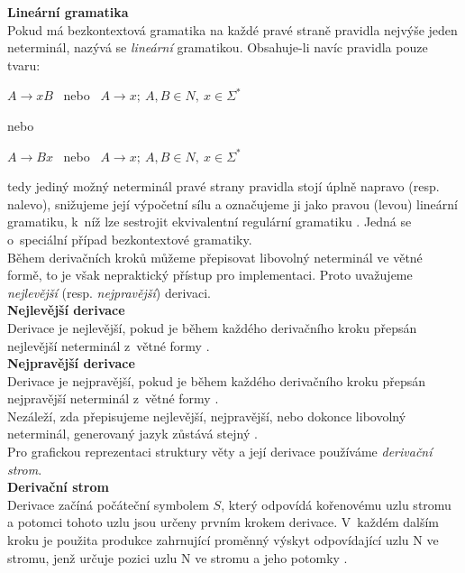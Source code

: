 \textbf{Lineární gramatika} \\
Pokud má bezkontextová gramatika na každé pravé straně pravidla nejvýše jeden neterminál, nazývá se \textit{lineární} gramatikou. Obsahuje-li navíc 
pravidla pouze tvaru:
\begin{center}
$ A \rightarrow xB$ \ nebo \ $A \rightarrow x; \ A,B \in N, \ x \in \Sigma^*$
\end{center}
nebo
\begin{center}
$ A \rightarrow Bx$ \ nebo \ $A \rightarrow x; \ A,B \in N, \ x \in \Sigma^*$
\end{center}
tedy jediný možný neterminál pravé strany pravidla stojí úplně napravo (resp. nalevo), snižujeme její výpočetní sílu a označujeme ji jako pravou 
(levou) lineární gramatiku, k~níž lze sestrojit ekvivalentní regulární gramatiku \cite[str. 17]{TIN2013}. Jedná se o~speciální případ bezkontextové 
gramatiky. \\

Během derivačních kroků můžeme přepisovat libovolný neterminál ve větné formě, to je však nepraktický přístup pro implementaci. Proto uvažujeme 
\textit{nejlevější} (resp. \textit{nejpravější}) derivaci. \\

\textbf{Nejlevější derivace} \\
Derivace je nejlevější, pokud je během každého derivačního kroku přepsán nejlevější neterminál z~větné formy 
\cite[str. 90]{Meduna2014}.\\

\textbf{Nejpravější derivace} \\
Derivace je nejpravější, pokud je během každého derivačního kroku přepsán nejpravější neterminál z~větné formy 
\cite[str. 92]{Meduna2014}. \\

Nezáleží, zda přepisujeme nejlevější, nejpravější, nebo dokonce libovolný neterminál, generovaný jazyk zůstává stejný 
\cite[str. 94]{Meduna2014}. \\

Pro grafickou reprezentaci struktury věty a její derivace používáme \textit{derivační strom}. \\

\textbf{Derivační strom} \\
Derivace začíná počáteční symbolem $S$, který odpovídá kořenovému uzlu stromu a potomci tohoto uzlu jsou určeny prvním krokem derivace. V~každém dalším 
kroku je použita produkce zahrnující proměnný výskyt odpovídající uzlu N ve stromu, jenž určuje pozici uzlu N ve stromu a jeho potomky 
\cite[str. 142]{Martin2011}.\\

